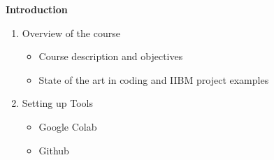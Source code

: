 \documentclass[letter,11pt]{article}
\begin{document}
\vspace{0.3cm}
\hspace{0.7cm}  \Large \textbf{Introduction} \large
\vspace{-0.5cm}
\begin{enumerate}
    \itemsep-0.4em 
    \item Overview of the course
    \begin{itemize}
        \vspace{-0.3cm}
        \item Course description and objectives
        \item State of the art in coding and IIBM project examples
    \end{itemize}
    \item Setting up Tools
        \begin{itemize}
            \vspace{-0.3cm}
            \item Google Colab
            \item Github
        \end{itemize}
        

\end{enumerate}
\end{document}
